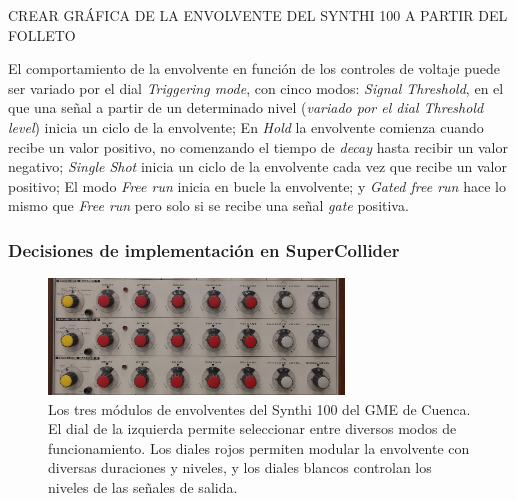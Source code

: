 CREAR GRÁFICA DE LA ENVOLVENTE DEL SYNTHI 100 A PARTIR DEL FOLLETO

El comportamiento de la envolvente en función de los controles de voltaje puede ser variado por el dial \textit{Triggering mode}, con cinco modos: \textit{Signal Threshold}, en el que una señal a partir de un determinado nivel (\textit{variado por el dial \textit{Threshold level}}) inicia un ciclo de la envolvente; En \textit{Hold} la envolvente comienza cuando recibe un valor positivo, no comenzando el tiempo de \textit{decay} hasta recibir un valor negativo;  \textit{Single Shot} inicia un ciclo de la envolvente cada vez que recibe un valor positivo; El modo \textit{Free run} inicia en bucle la envolvente; y \textit{Gated free run} hace lo mismo que \textit{Free run} pero solo si se recibe una señal \textit{gate} positiva.

\subsubsection{Decisiones de implementación en SuperCollider}


\begin{figure}
	\centering
	\includegraphics[width=0.7\textwidth]{images/envelopes}
	\caption[Las envolventes del Synthi 100 del GME]{Los tres módulos de envolventes del Synthi 100 del GME de Cuenca. El dial de la izquierda permite seleccionar entre diversos modos de funcionamiento. Los diales rojos permiten modular la envolvente con diversas duraciones y niveles, y los diales blancos controlan los niveles de las señales de salida.}
	\label{fig:envelopes}
\end{figure}

